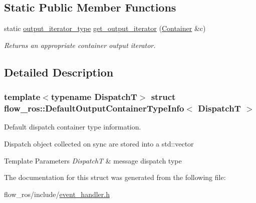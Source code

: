 \subsection*{Static Public Member Functions}
\begin{DoxyCompactItemize}
\item 
\mbox{\label{structflow__ros_1_1_default_output_container_type_info_ab175492907ef77b1f512a8acaa208260}} 
static \hyperlink{structflow__ros_1_1_default_output_container_type_info_a8fcd2ae4f8d0f4fb411b6a433b40d5f2}{output\+\_\+iterator\+\_\+type} \hyperlink{structflow__ros_1_1_default_output_container_type_info_ab175492907ef77b1f512a8acaa208260}{get\+\_\+output\+\_\+iterator} (\hyperlink{structflow__ros_1_1_default_output_container_type_info_a4ffbb4d1e03977b064edda2072187299}{Container} \&c)
\begin{DoxyCompactList}\small\item\em Returns an appropriate container output iterator. \end{DoxyCompactList}\end{DoxyCompactItemize}


\subsection{Detailed Description}
\subsubsection*{template$<$typename DispatchT$>$\newline
struct flow\+\_\+ros\+::\+Default\+Output\+Container\+Type\+Info$<$ Dispatch\+T $>$}

Default dispatch container type information. 

Dispatch object collected on sync are stored into a {\ttfamily std\+::vector}


\begin{DoxyTemplParams}{Template Parameters}
{\em DispatchT} & message dispatch type \\
\hline
\end{DoxyTemplParams}


The documentation for this struct was generated from the following file\+:\begin{DoxyCompactItemize}
\item 
flow\+\_\+ros/include/\hyperlink{event__handler_8h}{event\+\_\+handler.\+h}\end{DoxyCompactItemize}
